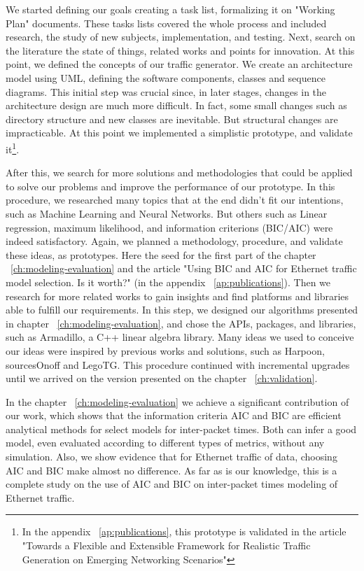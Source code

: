 We started defining our goals creating a task list, formalizing it on "Working Plan" documents. These tasks lists covered the whole process and included research, the study of new subjects, implementation, and testing. Next, search on the literature the state of things, related works and points for innovation. At this point, we defined the concepts of our traffic generator. We create an architecture model using UML, defining the software components, classes and sequence diagrams. This initial step was crucial since, in later stages, changes in the architecture design are much more difficult. In fact, some small changes such as directory structure and new classes are inevitable. But structural changes are impracticable. At this point we implemented a simplistic prototype, and validate it\footnote{In the appendix ~\ref{ap:publications}, this prototype is validated in the article "Towards a Flexible and Extensible Framework for Realistic Traffic Generation on Emerging Networking Scenarios"}. 


After this, we search for more solutions and methodologies that could be applied to solve our problems and improve the performance of our prototype. In this procedure, we researched many topics that at the end didn't fit our intentions, such as Machine Learning and Neural Networks. But others such as Linear regression, maximum likelihood, and information criterions (BIC/AIC) were indeed satisfactory. Again, we planned a methodology, procedure, and validate these ideas, as prototypes. Here the seed for the first part of the chapter ~\ref{ch:modeling-evaluation} and the article "Using BIC and AIC for Ethernet traffic model selection. Is it worth?" (in the appendix ~\ref{ap:publications}). Then we research for more related works to gain insights and find platforms and libraries able to fulfill our requirements. In this step, we designed our algorithms presented in chapter ~\ref{ch:modeling-evaluation}, and chose the APIs, packages, and libraries, such as Armadillo\cite{armadillo}, a C++ linear algebra library. Many ideas we used to conceive our ideas were inspired by previous works and solutions, such as Harpoon\cite{harpoon-validation}, sourcesOnoff \cite{sourcesonoff-paper} and LegoTG\cite{legotg-paper}. This procedure continued with incremental upgrades until we arrived on the version presented on the chapter ~\ref{ch:validation}. 


In the chapter ~\ref{ch:modeling-evaluation} we achieve a significant contribution of our work, which shows that the information criteria AIC and BIC are efficient analytical methods for select models for inter-packet times. Both can infer a good model, even evaluated according to different types of metrics, without any simulation. Also, we show evidence that for Ethernet traffic of data, choosing AIC and BIC make almost no difference. As far as is our knowledge, this is a complete study on the use of AIC and BIC on inter-packet times modeling of Ethernet traffic.


